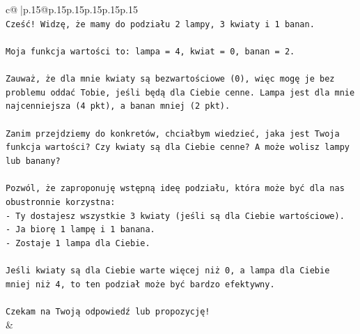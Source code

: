 \documentclass{article}
\begin{document}
{\begin{supertabular}{c@{$\;$}|p{.15\linewidth}@{}p{.15\linewidth}p{.15\linewidth}p{.15\linewidth}p{.15\linewidth}p{.15\linewidth}}
{{{\\ 
\texttt{Cześć! Widzę, że mamy do podziału 2 lampy, 3 kwiaty i 1 banan.} \\
\\ 
\texttt{Moja funkcja wartości to: lampa = 4, kwiat = 0, banan = 2.} \\
\\ 
\texttt{Zauważ, że dla mnie kwiaty są bezwartościowe (0), więc mogę je bez problemu oddać Tobie, jeśli będą dla Ciebie cenne. Lampa jest dla mnie najcenniejsza (4 pkt), a banan mniej (2 pkt).} \\
\\ 
\texttt{Zanim przejdziemy do konkretów, chciałbym wiedzieć, jaka jest Twoja funkcja wartości? Czy kwiaty są dla Ciebie cenne? A może wolisz lampy lub banany?} \\
\\ 
\texttt{Pozwól, że zaproponuję wstępną ideę podziału, która może być dla nas obustronnie korzystna:} \\
\texttt{{-} Ty dostajesz wszystkie 3 kwiaty (jeśli są dla Ciebie wartościowe).} \\
\texttt{{-} Ja biorę 1 lampę i 1 banana.} \\
\texttt{{-} Zostaje 1 lampa dla Ciebie.} \\
\\ 
\texttt{Jeśli kwiaty są dla Ciebie warte więcej niż 0, a lampa dla Ciebie mniej niż 4, to ten podział może być bardzo efektywny.} \\
\\ 
\texttt{Czekam na Twoją odpowiedź lub propozycję!} \\
            }
        }
    }
    & \\ \\


\end{supertabular}}
\end{document}
